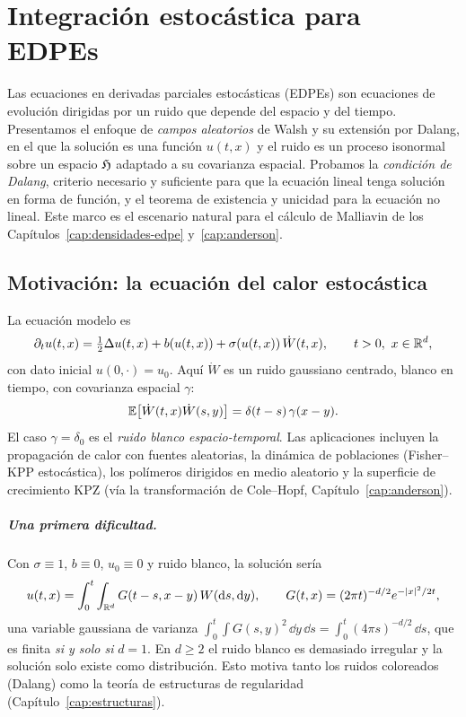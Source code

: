 \chapter{Integración estocástica para EDPEs}\label{cap:integracion-edpe}

\begin{panorama}
Las ecuaciones en derivadas parciales estocásticas (EDPEs) son ecuaciones de evolución
dirigidas por un ruido que depende del espacio y del tiempo. Presentamos el enfoque de
\emph{campos aleatorios} de Walsh y su extensión por Dalang, en el que la solución es una función
$u(t,x)$ y el ruido es un proceso isonormal sobre un espacio $\mathfrak{H}$ adaptado a su covarianza
espacial. Probamos la \emph{condición de Dalang}, criterio necesario y suficiente para que la
ecuación lineal tenga solución en forma de función, y el teorema de existencia y unicidad
para la ecuación no lineal. Este marco es el escenario natural para el cálculo de Malliavin
de los Capítulos~\ref{cap:densidades-edpe} y~\ref{cap:anderson}.
\end{panorama}

\section{Motivación: la ecuación del calor estocástica}
La ecuación modelo es
\begin{equation}\label{eq:calor-estocastica}
  \partial_tu(t,x)=\tfrac12\Delta u(t,x)+b(u(t,x))+\sigma(u(t,x))\,\dot W(t,x),\qquad t>0,\ x\in\mathbb{R}^d,
\end{equation}
con dato inicial $u(0,\cdot)=u_0$. Aquí $\dot W$ es un ruido gaussiano centrado, blanco en tiempo, con
covarianza espacial $\gamma$:
\[
  \mathbb{E}\big[\dot W(t,x)\dot W(s,y)\big]=\delta(t-s)\,\gamma(x-y).
\]
El caso $\gamma=\delta_0$ es el \emph{ruido blanco espacio-temporal}. Las aplicaciones incluyen la propagación de
calor con fuentes aleatorias, la dinámica de poblaciones (Fisher--KPP estocástica), los polímeros
dirigidos en medio aleatorio y la superficie de crecimiento KPZ (vía la transformación de
Cole--Hopf, Capítulo~\ref{cap:anderson}).

\paragraph{Una primera dificultad.} Con $\sigma\equiv1$, $b\equiv0$, $u_0\equiv0$ y ruido blanco, la solución sería
\[
  u(t,x)=\int_0^t\int_{\mathbb{R}^d}G(t-s,x-y)\,W(\mathrm{d} s,\mathrm{d} y),\qquad G(t,x)=(2\pi t)^{-d/2}e^{-\left\lvert x\right\rvert^2/2t},
\]
una variable gaussiana de varianza $\int_0^t\int G(s,y)^2\,\dd y\,\dd s=\int_0^t(4\pi s)^{-d/2}\,\dd s$, que es finita \emph{si y solo
si} $d=1$. En $d\ge2$ el ruido blanco es demasiado irregular y la solución solo existe como
distribución. Esto motiva tanto los ruidos coloreados (Dalang) como la teoría de estructuras de
regularidad (Capítulo~\ref{cap:estructuras}).

